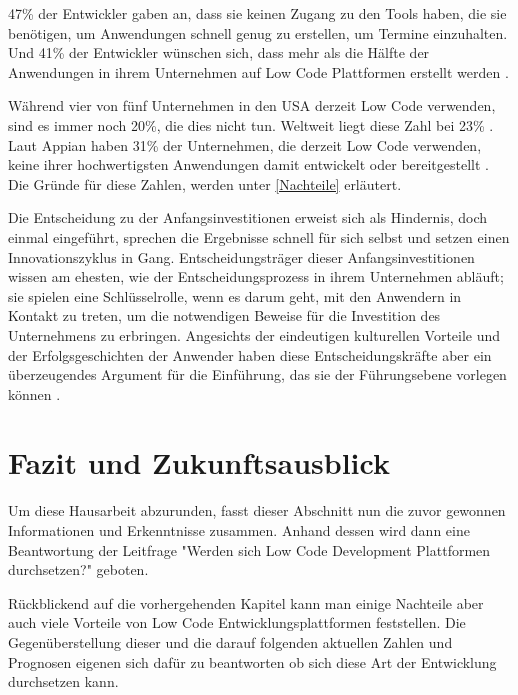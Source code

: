 \documentclass[12pt]{article} %
\begin{document}
	47\% der Entwickler gaben an, dass sie keinen Zugang zu den Tools haben, die sie benötigen, um Anwendungen schnell genug zu erstellen, um Termine einzuhalten. Und 41\% der Entwickler wünschen sich, dass mehr als die Hälfte der Anwendungen in ihrem Unternehmen auf Low Code Plattformen erstellt werden \autocite{KevinShuler.2023}. \newline
	
	Während vier von fünf Unternehmen in den USA derzeit Low Code verwenden, sind es immer noch 20\%, die dies nicht tun. Weltweit liegt diese Zahl bei 23\% \autocite{KevinShuler.2023}. Laut Appian haben 31\% der Unternehmen, die derzeit Low Code verwenden, keine ihrer hochwertigsten Anwendungen damit entwickelt oder bereitgestellt \autocite{KevinShuler.2023}. Die Gründe für diese Zahlen, werden unter \ref{Nachteile} erläutert. \newline
	
	Die Entscheidung zu der Anfangsinvestitionen erweist sich als Hindernis, doch einmal eingeführt, sprechen die Ergebnisse schnell für sich selbst und setzen einen Innovationszyklus in Gang. Entscheidungsträger dieser Anfangsinvestitionen wissen am ehesten, wie der Entscheidungsprozess in ihrem Unternehmen abläuft; sie spielen eine Schlüsselrolle, wenn es darum geht, mit den Anwendern in Kontakt zu treten, um die notwendigen Beweise für die Investition des Unternehmens zu erbringen. Angesichts der eindeutigen kulturellen Vorteile und der Erfolgsgeschichten der Anwender haben diese Entscheidungskräfte aber ein überzeugendes Argument für die Einführung, das sie der Führungsebene vorlegen können \autocite{Microsoft.2022}.
		
	
	\section{Fazit und Zukunftsausblick}
	Um diese Hausarbeit abzurunden, fasst dieser Abschnitt nun die zuvor gewonnen Informationen und Erkenntnisse zusammen. Anhand dessen wird dann eine Beantwortung der Leitfrage "Werden sich Low Code Development Plattformen durchsetzen?" geboten. \newline
	
	Rückblickend auf die vorhergehenden Kapitel kann man einige Nachteile aber auch viele Vorteile von Low Code Entwicklungsplattformen feststellen. Die Gegenüberstellung dieser und die darauf folgenden aktuellen Zahlen und Prognosen eigenen sich dafür zu beantworten ob sich diese Art der Entwicklung durchsetzen kann. \newline
	
\end{document}
